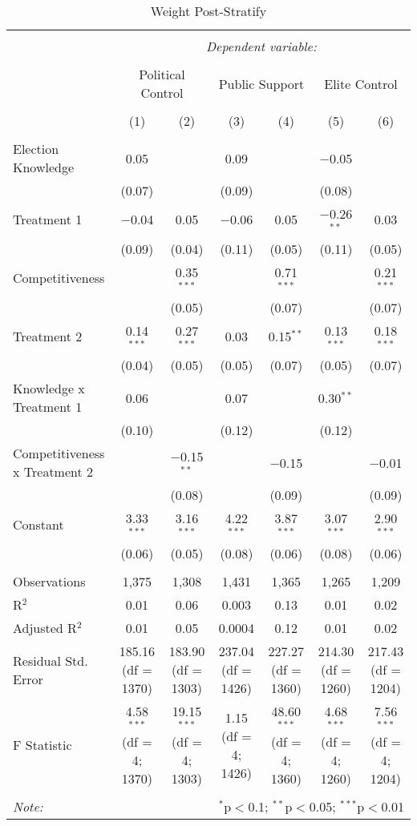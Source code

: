 
\begin{table}[!htbp] \centering 
  \caption{Weight Post-Stratify} 
  \label{} 
\small 
\begin{tabular}{@{\extracolsep{3pt}}lcccccc} 
\\[-1.8ex]\hline 
\hline \\[-1.8ex] 
 & \multicolumn{6}{c}{\textit{Dependent variable:}} \\ 
\cline{2-7} 
\\[-1.8ex] & \multicolumn{2}{c}{Political Control} & \multicolumn{2}{c}{Public Support} & \multicolumn{2}{c}{Elite Control} \\ 
\\[-1.8ex] & (1) & (2) & (3) & (4) & (5) & (6)\\ 
\hline \\[-1.8ex] 
 Election Knowledge & 0.05 &  & 0.09 &  & $-$0.05 &  \\ 
  & (0.07) &  & (0.09) &  & (0.08) &  \\ 
  Treatment 1 & $-$0.04 & 0.05 & $-$0.06 & 0.05 & $-$0.26$^{**}$ & 0.03 \\ 
  & (0.09) & (0.04) & (0.11) & (0.05) & (0.11) & (0.05) \\ 
  Competitiveness &  & 0.35$^{***}$ &  & 0.71$^{***}$ &  & 0.21$^{***}$ \\ 
  &  & (0.05) &  & (0.07) &  & (0.07) \\ 
  Treatment 2 & 0.14$^{***}$ & 0.27$^{***}$ & 0.03 & 0.15$^{**}$ & 0.13$^{***}$ & 0.18$^{***}$ \\ 
  & (0.04) & (0.05) & (0.05) & (0.07) & (0.05) & (0.07) \\ 
  Knowledge x Treatment 1 & 0.06 &  & 0.07 &  & 0.30$^{**}$ &  \\ 
  & (0.10) &  & (0.12) &  & (0.12) &  \\ 
  Competitiveness x Treatment 2 &  & $-$0.15$^{**}$ &  & $-$0.15 &  & $-$0.01 \\ 
  &  & (0.08) &  & (0.09) &  & (0.09) \\ 
  Constant & 3.33$^{***}$ & 3.16$^{***}$ & 4.22$^{***}$ & 3.87$^{***}$ & 3.07$^{***}$ & 2.90$^{***}$ \\ 
  & (0.06) & (0.05) & (0.08) & (0.06) & (0.08) & (0.06) \\ 
 \hline \\[-1.8ex] 
Observations & 1,375 & 1,308 & 1,431 & 1,365 & 1,265 & 1,209 \\ 
R$^{2}$ & 0.01 & 0.06 & 0.003 & 0.13 & 0.01 & 0.02 \\ 
Adjusted R$^{2}$ & 0.01 & 0.05 & 0.0004 & 0.12 & 0.01 & 0.02 \\ 
Residual Std. Error & 185.16 (df = 1370) & 183.90 (df = 1303) & 237.04 (df = 1426) & 227.27 (df = 1360) & 214.30 (df = 1260) & 217.43 (df = 1204) \\ 
F Statistic & 4.58$^{***}$ (df = 4; 1370) & 19.15$^{***}$ (df = 4; 1303) & 1.15 (df = 4; 1426) & 48.60$^{***}$ (df = 4; 1360) & 4.68$^{***}$ (df = 4; 1260) & 7.56$^{***}$ (df = 4; 1204) \\ 
\hline 
\hline \\[-1.8ex] 
\textit{Note:}  & \multicolumn{6}{r}{$^{*}$p$<$0.1; $^{**}$p$<$0.05; $^{***}$p$<$0.01} \\ 
\end{tabular} 
\end{table} 
